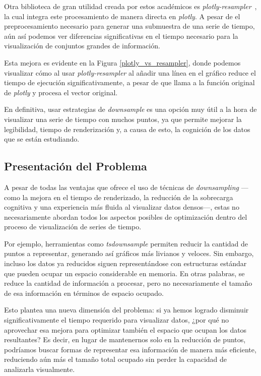 Otra biblioteca de gran utilidad creada por estos académicos es \textit{plotly-resampler}~\cite{plotly-resampler}, la cual integra este procesamiento de manera directa en \textit{plotly}. A pesar de el preprocesamiento necesario para generar una submuestra de una serie de tiempo, aún así podemos ver diferencias significativas en el tiempo necesario para la visualización de conjuntos grandes de información.

Esta mejora es evidente en la Figura \ref{plotly_vs_resampler}, donde podemos visualizar cómo al usar \textit{plotly-resampler} al añadir una línea en el gráfico reduce el tiempo de ejecución significativamente, a pesar de que llama a la función original de \textit{plotly} y procesa el vector original.

En definitiva, usar estrategias de \textit{downsample} es una opción muy útil a la hora de visualizar una serie de tiempo con muchos puntos, ya que permite mejorar la legibilidad, tiempo de renderización y, a causa de esto, la cognición de los datos que se están estudiando.

\subsection{Presentación del Problema}

A pesar de todas las ventajas que ofrece el uso de técnicas de \textit{downsampling} —como la mejora en el tiempo de renderizado, la reducción de la sobrecarga cognitiva y una experiencia más fluida al visualizar datos densos—, estas no necesariamente abordan todos los aspectos posibles de optimización dentro del proceso de visualización de series de tiempo.

Por ejemplo, herramientas como \textit{tsdownsample} permiten reducir la cantidad de puntos a representar, generando así gráficos más livianos y veloces. Sin embargo, incluso los datos ya reducidos siguen representándose con estructuras estándar que pueden ocupar un espacio considerable en memoria. En otras palabras, se reduce la cantidad de información a procesar, pero no necesariamente el tamaño de esa información en términos de espacio ocupado.

Esto plantea una nueva dimensión del problema: si ya hemos logrado disminuir significativamente el tiempo requerido para visualizar datos, ¿por qué no aprovechar esa mejora para optimizar también el espacio que ocupan los datos resultantes? Es decir, en lugar de mantenernos solo en la reducción de puntos, podríamos buscar formas de representar esa información de manera más eficiente, reduciendo aún más el tamaño total ocupado sin perder la capacidad de analizarla visualmente.

